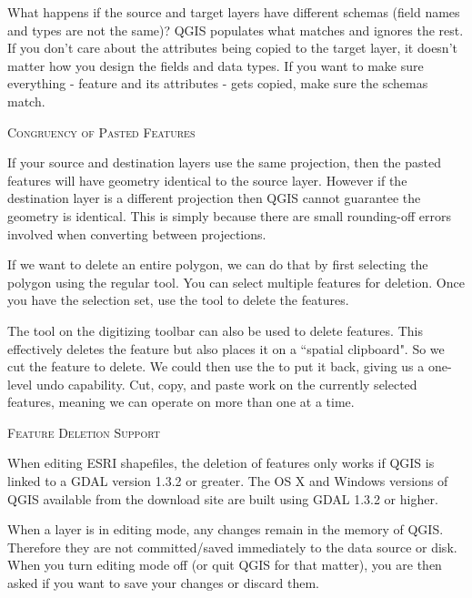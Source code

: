 What happens if the source and target layers have
different schemas (field names and types are not the same)? QGIS populates
what matches and ignores the rest. If you don't care about the attributes
being copied to the target layer, it doesn't matter how you design the
fields and data types. If you want to make sure everything - feature and its
attributes - gets copied, make sure the schemas match.

\begin{Tip}\caption{\textsc{Congruency of Pasted Features}}
If your source and destination layers use the
same projection, then the pasted features will have
geometry identical to the source layer.
However if the destination layer is a different projection
then QGIS cannot guarantee the geometry is identical.
This is simply because there are small rounding-off errors
involved when converting between projections.
\end{Tip}


If we want to delete an entire polygon, we can do that by first selecting 
the polygon using the regular  tool. You can select 
multiple features for deletion. Once you have the selection set, use the 
 tool to delete the features. 

The  tool on the digitizing toolbar can
also be used to delete features. This effectively deletes the feature but
also places it on a ``spatial clipboard". So we cut the feature to delete. 
We could then use the  to put it back, giving us a one-level undo 
capability. Cut, copy, and paste work on the currently selected features, 
meaning we can operate on more than one at a time.

\begin{Tip}\caption{\textsc{Feature Deletion Support}}
When editing ESRI shapefiles, the deletion
of features only works if QGIS is linked to a GDAL version 1.3.2 or greater. 
The OS X and Windows versions of QGIS available from the download site are built 
using GDAL 1.3.2 or higher.
\end{Tip}


When a layer is in editing mode, any changes remain in the memory of QGIS.
Therefore they are not committed/saved immediately to the data source or disk.
When you turn editing mode off (or quit QGIS for that matter), 
you are then asked if you want to save your
changes or discard them.

